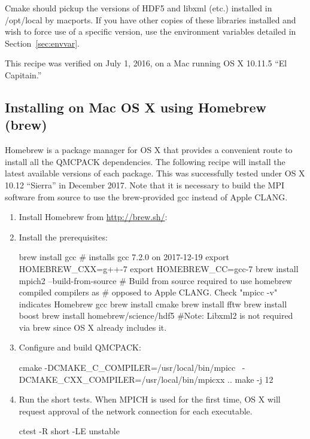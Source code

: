 Cmake should pickup the versions of HDF5 and libxml (etc.) installed in
/opt/local by macports. If you have other copies of these libraries
installed and wish to force use of a specific version, use the
environment variables detailed in Section~\ref{sec:envvar}.

This recipe was verified on July 1, 2016, on a Mac running OS X 10.11.5
``El Capitain.''

\subsection{Installing on Mac OS X using Homebrew (brew)}
Homebrew is a package manager for OS X that provides a convenient
route to install all the QMCPACK dependencies. The
following recipe will install the latest available versions of each
package. This was successfully tested under OS X 10.12 ``Sierra'' in December 2017. Note that it is necessary to build the MPI software from
source to use the brew-provided gcc instead of Apple CLANG.

\begin{enumerate}
\item Install Homebrew from \url{http://brew.sh/}:
%
 
\item Install the prerequisites:
%
\begin{shade}
brew install gcc # installs gcc 7.2.0 on 2017-12-19
export HOMEBREW_CXX=g++-7
export HOMEBREW_CC=gcc-7
brew install mpich2 --build-from-source
# Build from source required to use homebrew compiled compilers as
# opposed to Apple CLANG. Check "mpicc -v" indicates Homebrew gcc
brew install cmake
brew install fftw
brew install boost
brew install homebrew/science/hdf5
#Note: Libxml2 is not required via brew since OS X already includes it.
\end{shade}
\item Configure and build QMCPACK:
%
\begin{shade}
cmake -DCMAKE_C_COMPILER=/usr/local/bin/mpicc \
      -DCMAKE_CXX_COMPILER=/usr/local/bin/mpicxx ..
make -j 12
\end{shade}
\item Run the short tests. When MPICH is used for the first time, OS
  X will request approval of the network connection for each executable.
%
\begin{shade}
ctest -R short -LE unstable
\end{shade}
\end{enumerate}


